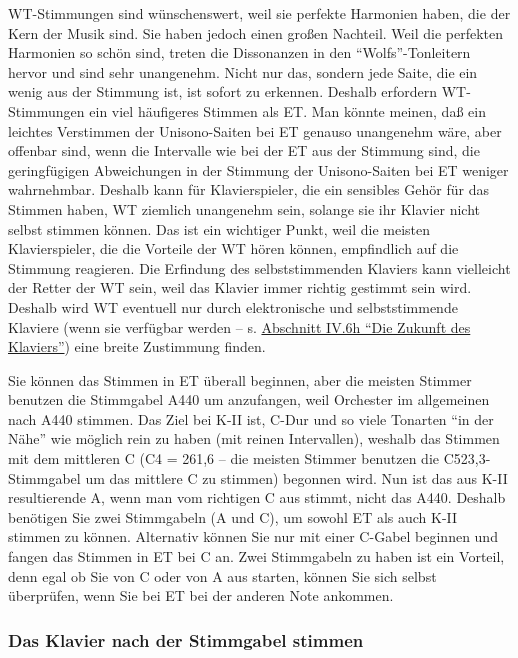 WT-Stimmungen sind wünschenswert, weil sie perfekte Harmonien haben, die der Kern der Musik sind.
Sie haben jedoch einen großen Nachteil.
Weil die perfekten Harmonien so schön sind, treten die Dissonanzen in den \enquote{Wolfs}-Tonleitern hervor und sind sehr unangenehm.
Nicht nur das, sondern jede Saite, die ein wenig aus der Stimmung ist, ist sofort zu erkennen.
Deshalb erfordern WT-Stimmungen ein viel häufigeres Stimmen als ET.
Man könnte meinen, daß ein leichtes Verstimmen der Unisono-Saiten bei ET genauso unangenehm wäre, aber offenbar sind, wenn die Intervalle wie bei der ET aus der Stimmung sind, die geringfügigen Abweichungen in der Stimmung der Unisono-Saiten bei ET weniger wahrnehmbar.
Deshalb kann für Klavierspieler, die ein sensibles Gehör für das Stimmen haben, WT ziemlich unangenehm sein, solange sie ihr Klavier nicht selbst stimmen können.
Das ist ein wichtiger Punkt, weil die meisten Klavierspieler, die die Vorteile der WT hören können, empfindlich auf die Stimmung reagieren.
Die Erfindung des selbststimmenden Klaviers kann vielleicht der Retter der WT sein, weil das Klavier immer richtig gestimmt sein wird.
Deshalb wird WT eventuell nur durch elektronische und selbststimmende Klaviere (wenn sie verfügbar werden -- s. \hyperref[c1iv6h]{Abschnitt IV.6h \enquote{Die Zukunft des Klaviers}}) eine breite Zustimmung finden.

Sie können das Stimmen in ET überall beginnen, aber die meisten Stimmer benutzen die Stimmgabel A440 um anzufangen, weil Orchester im allgemeinen nach A440 stimmen.
Das Ziel bei K-II ist, C-Dur und so viele Tonarten \enquote{in der Nähe} wie möglich rein zu haben (mit reinen Intervallen), weshalb das Stimmen mit dem mittleren C (C4 = 261,6 -- die meisten Stimmer benutzen die C523,3-Stimmgabel um das mittlere C zu stimmen) begonnen wird.
Nun ist das aus K-II resultierende A, wenn man vom richtigen C aus stimmt, nicht das A440.
Deshalb benötigen Sie zwei Stimmgabeln (A und C), um sowohl ET als auch K-II stimmen zu können.
Alternativ können Sie nur mit einer C-Gabel beginnen und fangen das Stimmen in ET bei C an.
Zwei Stimmgabeln zu haben ist ein Vorteil, denn egal ob Sie von C oder von A aus starten, können Sie sich selbst überprüfen, wenn Sie bei ET bei der anderen Note ankommen.


\label{c2_6b}
\subsubsection{Das Klavier nach der Stimmgabel stimmen}
\label{c2_6_gabe}

